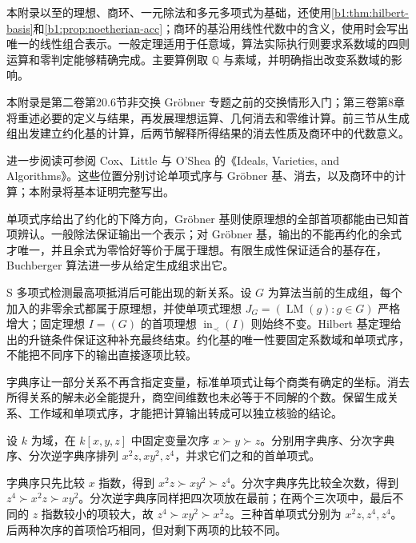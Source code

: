\ProseParagraphBreak

本附录以至的理想、商环、一元除法和多元多项式为基础，还使用\cref{b1:thm:hilbert-basis}和\cref{b1:prop:noetherian-acc}；商环的基沿用线性代数中的含义，使用时会写出唯一的线性组合表示。一般定理适用于任意域，算法实际执行则要求系数域的四则运算和零判定能够精确完成。主要算例取 \(\mathbb Q\) 与素域，并明确指出改变系数域的影响。

\ProseParagraphBreak
本附录是第二卷第20.6节非交换 Gröbner 专题之前的交换情形入门；第三卷第8章将重述必要的定义与结果，再发展理想运算、几何消去和零维计算。前三节从生成组出发建立约化基的计算，后两节解释所得结果的消去性质及商环中的代数意义。

\ProseParagraphBreak
进一步阅读可参阅 Cox、Little 与 O'Shea 的《Ideals, Varieties, and Algorithms》\cite[Chapter 2, \S\S 2--7; Chapter 3, \S 1; Chapter 5, \S\S 2--3]{CoxLittleOShea2015IdealsVarietiesAlgorithms}。这些位置分别讨论单项式序与 Gröbner 基、消去，以及商环中的计算；本附录将基本证明完整写出。







\begin{chaptersummary}
	单项式序给出了约化的下降方向，Gröbner 基则使原理想的全部首项都能由已知首项辨认。一般除法保证输出一个表示；对 Gröbner 基，输出的不能再约化的余式才唯一，并且余式为零恰好等价于属于理想。有限生成性保证适合的基存在，Buchberger 算法进一步从给定生成组求出它。

	\ProseParagraphBreak
	S 多项式检测最高项抵消后可能出现的新关系。设 \(G\) 为算法当前的生成组，每个加入的非零余式都属于原理想，并使单项式理想 \(J_G=(\operatorname{LM}(g):g\in G)\) 严格增大；固定理想 \(I=(G)\) 的首项理想 \(\operatorname{in}_{\prec}(I)\) 则始终不变。Hilbert 基定理给出的升链条件保证这种补充最终结束。约化基的唯一性要固定系数域和单项式序，不能把不同序下的输出直接逐项比较。

	\ProseParagraphBreak
	字典序让一部分关系不再含指定变量，标准单项式让每个商类有确定的坐标。消去所得关系的解未必全能提升，商空间维数也未必等于不同解的个数。保留生成关系、工作域和单项式序，才能把计算输出转成可以独立核验的结论。
\end{chaptersummary}

\BookExercises

\begin{exercise}\label{b1:ex:F-orders}
	设 \(k\) 为域，在 \(k[x,y,z]\) 中固定变量次序 \(x\succ y\succ z\)。分别用字典序、分次字典序、分次逆字典序排列 \(x^2z,xy^2,z^4\)，并求它们之和的首单项式。
\end{exercise}
\begin{solution}
	字典序只先比较 \(x\) 指数，得到 \(x^2z\succ xy^2\succ z^4\)。分次字典序先比较全次数，得到 \(z^4\succ x^2z\succ xy^2\)。分次逆字典序同样把四次项放在最前；在两个三次项中，最后不同的 \(z\) 指数较小的项较大，故 \(z^4\succ xy^2\succ x^2z\)。三种首单项式分别为 \(x^2z,z^4,z^4\)。后两种次序的首项恰巧相同，但对剩下两项的比较不同。
\end{solution}

